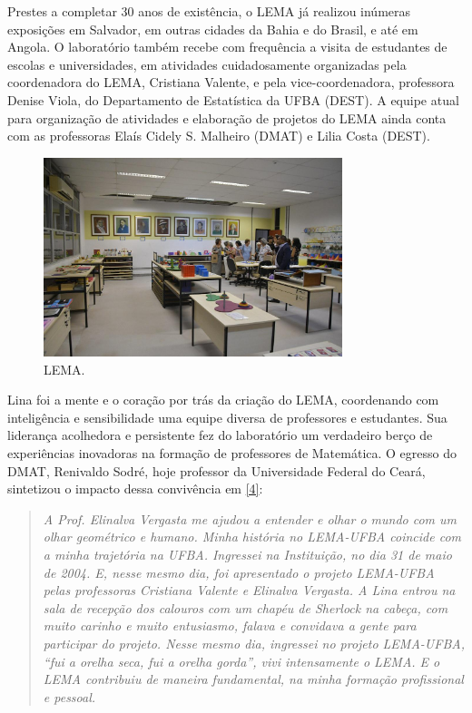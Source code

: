\documentclass{hipatia}
\begin{document}
Prestes a completar 30 anos de existência, o LEMA já realizou inúmeras exposições em Salvador, em outras cidades da Bahia e do Brasil, e até em Angola. O laboratório também recebe com frequência a visita de estudantes de escolas e universidades, em atividades cuidadosamente organizadas pela coordenadora  do LEMA, Cristiana Valente, e pela vice-coordenadora, professora Denise Viola, do Departamento de Estatística da UFBA (DEST). A equipe atual para organização de atividades e elaboração de projetos do LEMA ainda conta com as professoras Elaís Cidely S. Malheiro (DMAT) e Lilia Costa (DEST).

\begin{figure}[htb!]
\includegraphics[width=8.7cm]{Lab.jpeg}
\caption{LEMA.}   
\end{figure}


Lina foi a mente e o coração por trás da criação do LEMA, coordenando com inteligência e sensibilidade uma equipe diversa de professores e estudantes. Sua liderança acolhedora e persistente fez do laboratório um verdadeiro berço de experiências inovadoras na formação de professores de Matemática. O egresso do DMAT, Renivaldo Sodré, hoje professor da Universidade Federal do Ceará, sintetizou o impacto dessa convivência em \href{https://youtu.be/-kerHGWxOvk}{[4]}: \begin{quote}
  \textit{A Prof. Elinalva Vergasta me ajudou a entender e olhar o mundo com um olhar geométrico e humano.
Minha história no LEMA-UFBA coincide com a minha trajetória na UFBA. Ingressei na Instituição, no
dia 31 de maio de 2004.
E, nesse mesmo dia, foi apresentado o projeto LEMA-UFBA pelas professoras Cristiana Valente e Elinalva Vergasta.
A Lina entrou na sala de recepção dos calouros com um chapéu de Sherlock na cabeça, com muito carinho e muito entusiasmo, falava e convidava a gente para participar do projeto. Nesse mesmo dia, ingressei no projeto LEMA-UFBA, “fui a orelha seca, fui a orelha gorda”, vivi intensamente o LEMA.
E o LEMA contribuiu de maneira fundamental, na minha formação profissional e pessoal.}   
\end{quote}
\end{document}
